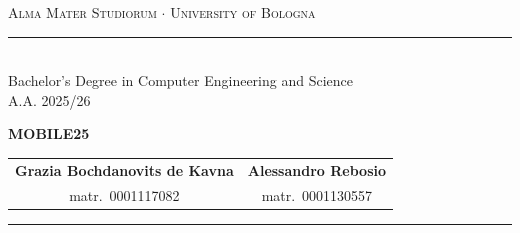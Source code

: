 \documentclass[12pt,a4paper]{report}
\begin{document}
\begin{titlepage}
  \begin{center}
    {{\Large{\textsc{Alma Mater Studiorum $\cdot$ University of
    Bologna}}}}\\[1ex]
    \rule{15.8cm}{0.6mm}\\[2ex]
    {\small Bachelor's Degree in Computer Engineering and Science}\\
    {\small{ A.A. 2025/26}}
  \end{center}

  \vfill
  \begin{center}
    {\LARGE{\bf MOBILE25}}\\[1ex]
  \end{center}
  \vfill

  \begin{center}
    \begin{tabular}{@{}c@{\qquad}c@{}}
      {\large\bf Grazia Bochdanovits de Kavna} & {\large\bf
      Alessandro Rebosio} \\[0.5ex]
      {\small matr.\ 0001117082} & {\small matr.\ 0001130557}
    \end{tabular}
  \end{center}

  \vspace{2mm}
  \noindent\rule{\linewidth}{0.4pt}

\end{titlepage}

\tableofcontents
\end{document}
